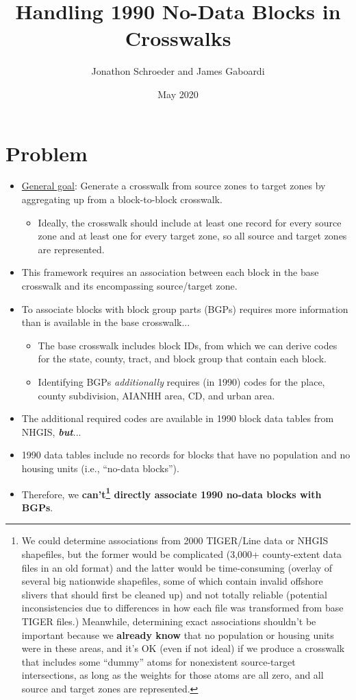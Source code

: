 \documentclass{article}
\title{Handling 1990 No-Data Blocks in Crosswalks}
\author{Jonathon Schroeder and James Gaboardi}
\date{May 2020}
\begin{document}
\maketitle



\section{Problem}

\begin{itemize}
  \item \href{https://github.com/jGaboardi/nhgisxwalk/blob/master/resources/general-crosswalk-construction-framework.pdf}{General goal}: Generate a crosswalk from source zones to target zones by aggregating up from a block-to-block crosswalk.
  \begin{itemize}
      \item Ideally, the crosswalk should include at least one record for every source zone and at least one for every target zone, so all source and target zones are represented.
  \end{itemize}
  \item This framework requires an association between each block in the base crosswalk and its encompassing source/target zone.
  \item To associate blocks with block group parts (BGPs) requires more information than is available in the base crosswalk...
  \begin{itemize}
      \item The base crosswalk includes block IDs, from which we can derive codes for the state, county, tract, and block group that contain each block.
      \item Identifying BGPs \textit{additionally} requires (in 1990) codes for the place, county subdivision, AIANHH area, CD, and urban area.
  \end{itemize}
  \item The additional required codes are available in 1990 block data tables from NHGIS, \textbf{\textit{but}}...
  \item 1990 data tables include no records for blocks that have no population and no housing units (i.e., ``no-data blocks'').
  \item Therefore, we \textbf{can't\footnote{We could determine associations from 2000 TIGER/Line data or NHGIS shapefiles, but the former would be complicated (3,000+ county-extent data files in an old format) and the latter would be time-consuming (overlay of several big nationwide shapefiles, some of which contain invalid offshore slivers that should first be cleaned up) and not totally reliable (potential inconsistencies due to differences in how each file was transformed from base TIGER files.) Meanwhile, determining exact associations shouldn't be important because we \textbf{already know} that no population or housing units were in these areas, and it's OK (even if not ideal) if we produce a crosswalk that includes some ``dummy'' atoms for nonexistent source-target intersections, as long as the weights for those atoms are all zero, and all source and target zones are represented.} directly associate 1990 no-data blocks with BGPs}.
\end{itemize}
\end{document}
